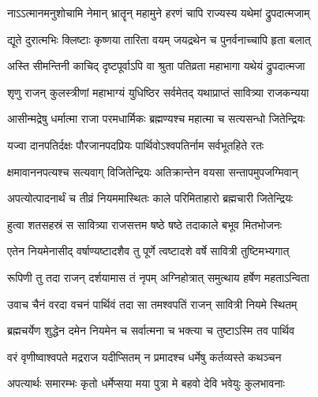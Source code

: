 
\begin{center}

\resetShloka


\twolineshloka
{नाऽऽत्मानमनुशोचामि नेमान् भ्रातॄन् महामुने}
{हरणं चापि राज्यस्य यथेमां द्रुपदात्मजाम्} %

\twolineshloka
{द्यूते दुरात्मभिः क्लिष्टाः कृष्णया तारिता वयम्}
{जयद्रथेन च पुनर्वनाच्चापि हृता बलात्} %

\twolineshloka
{अस्ति सीमन्तिनी काचिद् दृष्टपूर्वाऽपि वा श्रुता}
{पतिव्रता महाभागा यथेयं द्रुपदात्मजा} %


\twolineshloka
{शृणु राजन् कुलस्त्रीणां महाभाग्यं युधिष्ठिर}
{सर्वमेतद् यथाप्राप्तं सावित्र्या राजकन्यया} %

\twolineshloka
{आसीन्मद्रेषु धर्मात्मा राजा परमधार्मिकः}
{ब्रह्मण्यश्च महात्मा च सत्यसन्धो जितेन्द्रियः} %

\twolineshloka
{यज्वा दानपतिर्दक्षः पौरजानपदप्रियः}
{पार्थिवोऽश्वपतिर्नाम सर्वभूतहिते रतः} %

\twolineshloka
{क्षमावाननपत्यश्च सत्यवाग् विजितेन्द्रियः}
{अतिक्रान्तेन वयसा सन्तापमुपजग्मिवान्} %

\twolineshloka
{अपत्योत्पादनार्थं च तीव्रं नियममास्थितः}
{काले परिमिताहारो ब्रह्मचारी जितेन्द्रियः} %

\twolineshloka
{हुत्वा शतसहस्रं स सावित्र्या राजसत्तम}
{षष्ठे षष्ठे तदाकाले बभूव मितभोजनः} %

\twolineshloka
{एतेन नियमेनासीद् वर्षाण्यष्टादशैव तु}
{पूर्णे त्वष्टादशे वर्षे सावित्री तुष्टिमभ्यगात्} %

\twolineshloka
{रूपिणी तु तदा राजन् दर्शयामास तं नृपम्}
{अग्निहोत्रात् समुत्थाय हर्षेण महताऽन्विता} %

\twolineshloka
{उवाच चैनं वरदा वचनं पार्थिवं तदा}
{सा तमश्वपतिं राजन् सावित्री नियमे स्थितम्} %

\twolineshloka
{ब्रह्मचर्येण शुद्धेन दमेन नियमेन च}
{सर्वात्मना च भक्त्या च तुष्टाऽस्मि तव पार्थिव} %

\twolineshloka
{वरं वृणीष्वाश्वपते मद्रराज यदीप्सितम्}
{न प्रमादश्च धर्मेषु कर्तव्यस्ते कथञ्चन} %


\twolineshloka
{अपत्यार्थः समारम्भः कृतो धर्मेप्सया मया}
{पुत्रा मे बहवो देवि भवेयुः कुलभावनाः} %


\end{center}
